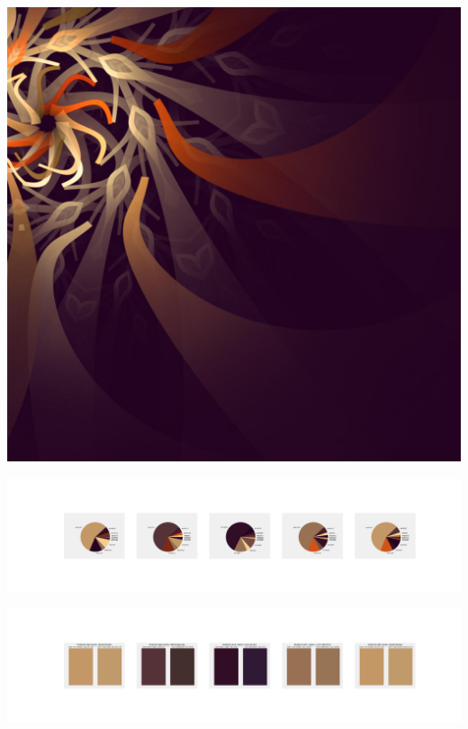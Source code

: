 \documentclass[11pt]{article}
\begin{document}
\begin{landscape}
    \begin{center}
    \includegraphics[width=\textwidth]{./nbimg/file (230).jpg}
    \end{center}

    \begin{center}
    \includegraphics[width=250mm]{./nbimg/pie-146.jpg}
    \end{center}

    \begin{center}
    \includegraphics[width=250mm]{./nbimg/peak-146.jpg}
    \end{center}
    


\end{landscape}
\end{document}
